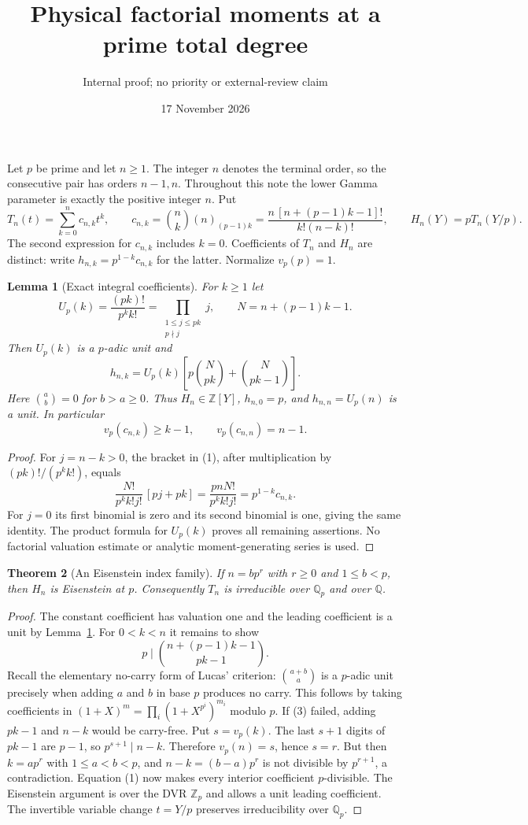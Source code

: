 \documentclass[11pt]{article}
\title{Physical factorial moments at a prime total degree}
\author{Internal proof; no priority or external-review claim}\date{17 November 2026}
\newtheorem{theorem}{Theorem}
\newtheorem{lemma}[theorem]{Lemma}
\begin{document}
\maketitle
Let $p$ be prime and let $n\ge1$. The integer $n$ denotes the
terminal order, so the consecutive pair has orders $n-1,n$.
Throughout this note the lower
Gamma parameter is exactly the positive integer $n$. Put
\[
 T_n(t)=\sum_{k=0}^n c_{n,k}t^k,\qquad
 c_{n,k}=\binom nk(n)_{(p-1)k}
       =\frac{n\,[n+(p-1)k-1]!}{k!(n-k)!},
 \qquad H_n(Y)=pT_n(Y/p).
\]
The second expression for $c_{n,k}$ includes $k=0$. Coefficients of
$T_n$ and $H_n$ are distinct: write $h_{n,k}=p^{1-k}c_{n,k}$ for
the latter. Normalize $v_p(p)=1$.

\begin{lemma}[Exact integral coefficients]\label{lem:coefficients}
For $k\ge1$ let
\[
 U_p(k)=\frac{(pk)!}{p^k k!}
       =\prod_{\substack{1\le j\le pk\\p\nmid j}}j,\qquad
 N=n+(p-1)k-1.
\]
Then $U_p(k)$ is a $p$-adic unit and
\[
 h_{n,k}=U_p(k)
 \left[p\binom N{pk}+\binom N{pk-1}\right].                 \tag{1}
\]
Here $\binom ab=0$ for $b>a\ge0$. Thus $H_n\in\mathbb Z[Y]$,
$h_{n,0}=p$, and $h_{n,n}=U_p(n)$ is a unit. In particular
\[
 v_p(c_{n,k})\ge k-1,\qquad v_p(c_{n,n})=n-1.              \tag{2}
\]
\end{lemma}
\begin{proof}
For $j=n-k>0$, the bracket in (1), after multiplication by
$(pk)!/(p^kk!)$, equals
\[
 \frac{N!}{p^kk!j!}\,[pj+pk]
 =\frac{pnN!}{p^kk!j!}=p^{1-k}c_{n,k}.
\]
For $j=0$ its first binomial is zero and its second binomial is
one, giving the same identity. The product formula for $U_p(k)$
proves all remaining assertions. No factorial valuation estimate
or analytic moment-generating series is used.
\end{proof}

\begin{theorem}[An Eisenstein index family]\label{thm:index}
If $n=bp^r$ with $r\ge0$ and $1\le b<p$, then $H_n$ is Eisenstein
at $p$. Consequently $T_n$ is irreducible over $\mathbb Q_p$
and over $\mathbb Q$.
\end{theorem}
\begin{proof}
The constant coefficient has valuation one and the leading
coefficient is a unit by Lemma~\ref{lem:coefficients}. For
$0<k<n$ it remains to show
\[
 p\mid \binom{n+(p-1)k-1}{pk-1}.                          \tag{3}
\]
Recall the elementary no-carry form of Lucas' criterion:
$\binom{a+b}{a}$ is a $p$-adic unit precisely when adding $a$
and $b$ in base $p$ produces no carry. This follows by taking
coefficients in
$(1+X)^m=\prod_i(1+X^{p^i})^{m_i}$ modulo $p$.
If (3) failed, adding $pk-1$ and $n-k$ would be carry-free.
Put $s=v_p(k)$. The last $s+1$ digits of $pk-1$ are $p-1$,
so $p^{s+1}\mid n-k$. Therefore $v_p(n)=s$, hence $s=r$.
But then $k=ap^r$ with $1\le a<b<p$, and
$n-k=(b-a)p^r$ is not divisible by $p^{r+1}$, a contradiction.
Equation (1) now makes every interior coefficient $p$-divisible.
The Eisenstein argument is over the DVR $\mathbb Z_p$ and
allows a unit leading coefficient. The invertible variable change
$t=Y/p$ preserves irreducibility over $\mathbb Q_p$.
\end{proof}
\end{document}
